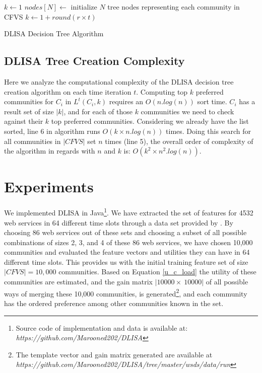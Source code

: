 \documentclass[10pt,journal,cspaper,compsoc]{IEEEtran}
\begin{document}
\begin{algorithm}
\DontPrintSemicolon
{}
$k \gets 1$\;
$nodes[N] \gets$ initialize $N$ tree nodes representing each community in CFVS\;
 {
	$k \gets 1 + round (r \times t)$\;
   {
	   {
		}
  }
}
\;
\caption{{\sc DLISA Decision Tree Algorithm}}
\label{algo:dectree}
\end{algorithm}

\subsection{DLISA Tree Creation Complexity}\label{ss:complexity}
Here we analyze the computational complexity of the DLISA decision tree creation algorithm on each time iteration $t$. Computing top $k$ preferred communities for $C_i$ in $L^t(C_i, k)$ requires an $O(n.log(n))$ sort time. $C_i$ has a result set of size $|k|$, and for each of those $k$ communities we need to check against their $k$ top preferred communities. Considering we already have the list sorted, line 6 in algorithm runs $O(k \times n.log(n))$ times. Doing this search for all communities in $|CFVS|$ set $n$ times (line 5), the overall order of complexity of the algorithm in regards with $n$ and $k$ is: $O(k^2 \times n^2.log(n))$.

\section{Experiments}\label{s:experiments}
We implemented DLISA in Java\footnote{Source code of implementation and data is available at: \emph{https://github.com/Marooned202/DLISA}}. We have extracted the set of features for 4532 web services in 64 different time slots through a data set provided by \cite{10.1109/ISSRE.2011.17}. By choosing 86 web services out of these sets and choosing a subset of all possible combinations of sizes 2, 3, and 4 of these 86 web services, we have chosen 10,000 communities and evaluated the feature vectors and utilities they can have in 64 different time slots. This provides us with the initial training feature set of size $|CFVS| = 10,000$ communities. Based on Equation \ref{u_c_load} the utility of these communities are estimated, and the gain matrix $|10000 \times~ 10000|$ of all possible ways of merging these 10,000 communities, is generated\footnote {The template vector and gain matrix generated are available at \emph{https://github.com/Marooned202/DLISA/tree/master/wsds/data/run}}, and each community has the ordered preference among other communities known in the set. 
\end{document}

